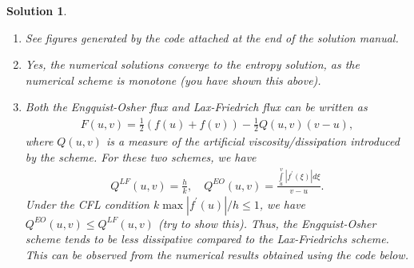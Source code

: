 \documentclass[10pt,letterpaper]{article}
\theoremstyle{break}
\newtheorem{mysolution}{Solution}
\newenvironment{solution}{\begin{mysolution}}{\end{mysolution}}
\begin{document}
\begin{solution}
	\begin{enumerate}
		\item
		See figures generated by the code
		attached at the end of the solution manual.
		
		\item
		Yes, the numerical solutions converge to the entropy solution, as the numerical scheme is monotone (you have shown this above).
		
		
		
		\item
		Both the Engquist-Osher flux and Lax-Friedrich flux can be written as
		\begin{gather}
		F(u,v) = \frac{1}{2} (f(u) + f(v)) - \frac{1}{2} Q(u,v) (v-u),
		\end{gather}
		where $Q(u,v)$ is a measure of the artificial viscosity/dissipation introduced by the scheme. For these two schemes, we have
		\begin{gather}
		Q^{LF}(u,v) = \frac{h}{k}, \quad Q^{EO}(u,v) = \frac{\int \limits_u^v |f^\prime(\xi) | d \xi }{v-u}.
		\end{gather}
		Under the CFL condition $k \max |f^\prime(u)| / h \leq 1$, we have $Q^{EO}(u,v) \leq Q^{LF}(u,v)$  (try to show this). Thus, the Engquist-Osher scheme tends to be less dissipative compared to the Lax-Friedrichs scheme. This can be observed from the numerical results obtained using the code below.
	\end{enumerate}
\end{solution}
\end{document}
